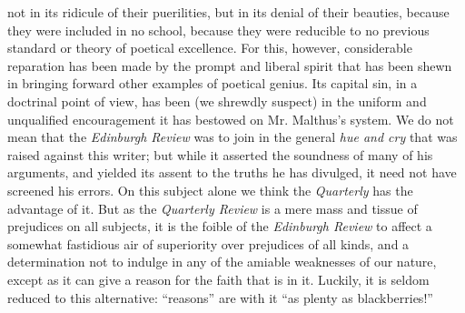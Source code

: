 not in its ridicule of their puerilities, but in its denial of
their beauties, because they were included in no school, because
they were reducible to no previous standard or theory of poetical
excellence. For this, however, considerable reparation has been
made by the prompt and liberal spirit that has been shewn in
bringing forward other examples of poetical genius. Its capital
sin, in a doctrinal point of view, has been (we shrewdly suspect)
in the uniform and unqualified encouragement it has bestowed on
Mr. Malthus's system.  We do not mean that the \emph{Edinburgh
  Review} was to join in the general \emph{hue and cry} that was
raised against this writer; but while it asserted the soundness of
many of his arguments, and yielded its assent to the truths he has
divulged, it need not have screened his errors. On this subject
alone we think the \emph{Quarterly} has the advantage of it. But
as the \emph{Quarterly Review} is a mere mass and tissue of
prejudices on all subjects, it is the foible of the
\emph{Edinburgh Review} to affect a somewhat fastidious air of
superiority over prejudices of all kinds, and a determination not
to indulge in any of the amiable weaknesses of our nature, except
as it can give a reason for the faith that is in it.  Luckily, it
is seldom reduced to this alternative: ``reasons'' are with it
``as plenty as blackberries!''


